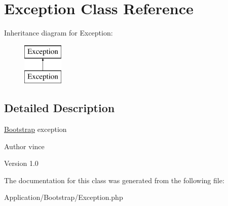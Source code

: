 \hypertarget{class_anemo_1_1_application_1_1_bootstrap_1_1_exception}{
\section{Exception Class Reference}
\label{class_anemo_1_1_application_1_1_bootstrap_1_1_exception}
}
Inheritance diagram for Exception:\begin{figure}[H]
\begin{center}
\leavevmode
\includegraphics[height=2.000000cm]{class_anemo_1_1_application_1_1_bootstrap_1_1_exception}
\end{center}
\end{figure}


\subsection{Detailed Description}
\hyperlink{namespace_anemo_1_1_application_1_1_bootstrap}{Bootstrap} exception \begin{DoxyAuthor}{Author}
vince 
\end{DoxyAuthor}
\begin{DoxyVersion}{Version}
1.0 
\end{DoxyVersion}


The documentation for this class was generated from the following file:\begin{DoxyCompactItemize}
\item 
Application/Bootstrap/Exception.php\end{DoxyCompactItemize}
